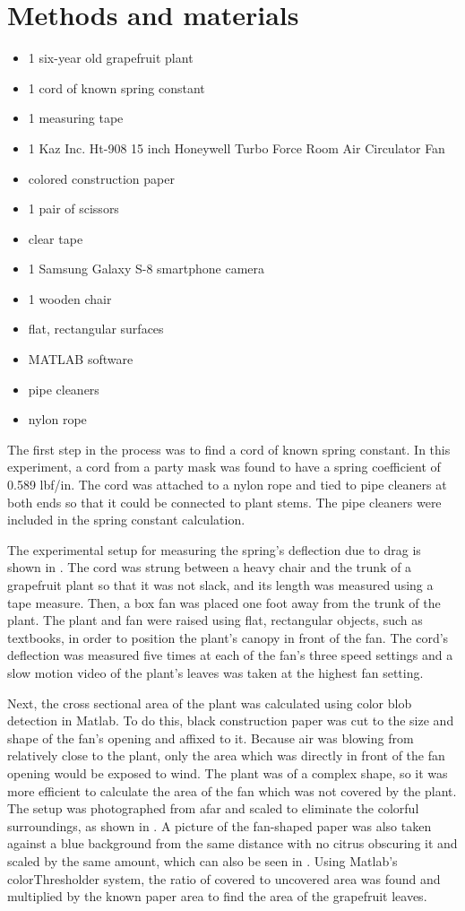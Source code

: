 \section{Methods and materials}
\begin{itemize}
\item 1 six-year old grapefruit plant
\item 1 cord of known spring constant
\item 1 measuring tape
\item 1 Kaz Inc. Ht-908 15 inch Honeywell Turbo Force Room Air Circulator Fan
\item colored construction paper
\item 1 pair of scissors
\item clear tape
\item 1 Samsung Galaxy S-8 smartphone camera
\item 1 wooden chair
\item flat, rectangular surfaces
\item MATLAB software
\item pipe cleaners
\item nylon rope
\end{itemize}

The first step in the process was to find a cord of known spring constant. In this experiment, a cord from a party mask was found to have a spring coefficient of 0.589 lbf/in. The cord was attached to a nylon rope and tied to pipe cleaners at both ends so that it could be connected to plant stems. The pipe cleaners were included in the spring constant calculation.

The experimental setup for measuring the spring's deflection due to drag is shown in . The cord was strung between a heavy chair and the trunk of a grapefruit plant so that it was not slack, and its length was measured using a tape measure. Then, a box fan was placed one foot away from the trunk of the plant. The plant and fan were raised using flat, rectangular objects, such as textbooks, in order to position the plant's canopy in front of the fan. The cord's deflection was measured five times at each of the fan's three speed settings and a slow motion video of the plant's leaves was taken at the highest fan setting.

Next, the cross sectional area of the plant was calculated using color blob detection in Matlab. To do this, black construction paper was cut to the size and shape of the fan's opening and affixed to it. Because air was blowing from relatively close to the plant, only the area which was directly in front of the fan opening would be exposed to wind. The plant was of a complex shape, so it was more efficient to calculate the area of the fan which was not covered by the plant. The setup was photographed from afar and scaled to eliminate the colorful surroundings, as shown in . A picture of the fan-shaped paper was also taken against a blue background from the same distance with no citrus obscuring it and scaled by the same amount, which can also be seen in . Using Matlab's colorThresholder system, the ratio of covered to uncovered area was found and multiplied by the known paper area to find the area of the grapefruit leaves.

